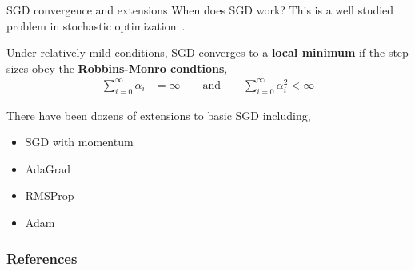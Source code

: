 \documentclass[aspectratio=169]{beamer}
\begin{document}
\begin{frame}[t]{SGD convergence and extensions}
    When does SGD work? This is a well studied problem in stochastic optimization~\citep{bottou1998online, robbins1971convergence}.
    
    Under relatively mild conditions, SGD converges to a \textbf{local minimum} if the step sizes obey the \textbf{Robbins-Monro condtions},
    \begin{align*}
        \sum_{i=0}^\infty \alpha_i &= \infty \qquad \text{and} \qquad
        \sum_{i=0}^\infty \alpha_i^2 < \infty
    \end{align*}
    
    There have been dozens of extensions to basic SGD including,
    \begin{itemize}
        \item SGD with momentum
        \item AdaGrad \citep{duchi2011adaptive}
        \item RMSProp 
        \item Adam \citep{kingma2014adam}
    \end{itemize}
\end{frame}



\begin{frame}[t,allowframebreaks]
        \frametitle{References}
        
        
\end{frame}
\end{document}
